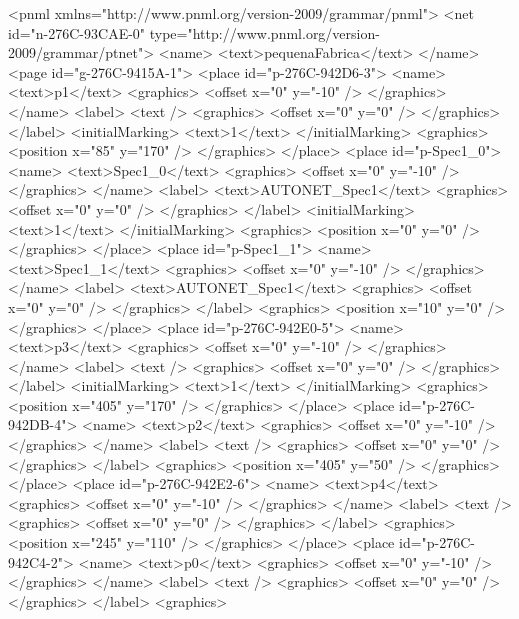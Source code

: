 <pnml xmlns="http://www.pnml.org/version-2009/grammar/pnml">
 <net id="n-276C-93CAE-0" type="http://www.pnml.org/version-2009/grammar/ptnet">
  <name>
   <text>pequenaFabrica</text>
  </name>
  <page id="g-276C-9415A-1">
   <place id="p-276C-942D6-3">
    <name>
     <text>p1</text>
     <graphics>
      <offset x="0" y="-10" />
     </graphics>
    </name>
    <label>
     <text />
     <graphics>
      <offset x="0" y="0" />
     </graphics>
    </label>
    <initialMarking>
     <text>1</text>
    </initialMarking>
    <graphics>
     <position x="85" y="170" />
    </graphics>
   </place>
   <place id="p-Spec1\_0">
    <name>
     <text>Spec1\_0</text>
     <graphics>
      <offset x="0" y="-10" />
     </graphics>
    </name>
    <label>
     <text>AUTONET\_Spec1</text>
     <graphics>
      <offset x="0" y="0" />
     </graphics>
    </label>
    <initialMarking>
     <text>1</text>
    </initialMarking>
    <graphics>
     <position x="0" y="0" />
    </graphics>
   </place>
   <place id="p-Spec1\_1">
    <name>
     <text>Spec1\_1</text>
     <graphics>
      <offset x="0" y="-10" />
     </graphics>
    </name>
    <label>
     <text>AUTONET\_Spec1</text>
     <graphics>
      <offset x="0" y="0" />
     </graphics>
    </label>
    <graphics>
     <position x="10" y="0" />
    </graphics>
   </place>
   <place id="p-276C-942E0-5">
    <name>
     <text>p3</text>
     <graphics>
      <offset x="0" y="-10" />
     </graphics>
    </name>
    <label>
     <text />
     <graphics>
      <offset x="0" y="0" />
     </graphics>
    </label>
    <initialMarking>
     <text>1</text>
    </initialMarking>
    <graphics>
     <position x="405" y="170" />
    </graphics>
   </place>
   <place id="p-276C-942DB-4">
    <name>
     <text>p2</text>
     <graphics>
      <offset x="0" y="-10" />
     </graphics>
    </name>
    <label>
     <text />
     <graphics>
      <offset x="0" y="0" />
     </graphics>
    </label>
    <graphics>
     <position x="405" y="50" />
    </graphics>
   </place>
   <place id="p-276C-942E2-6">
    <name>
     <text>p4</text>
     <graphics>
      <offset x="0" y="-10" />
     </graphics>
    </name>
    <label>
     <text />
     <graphics>
      <offset x="0" y="0" />
     </graphics>
    </label>
    <graphics>
     <position x="245" y="110" />
    </graphics>
   </place>
   <place id="p-276C-942C4-2">
    <name>
     <text>p0</text>
     <graphics>
      <offset x="0" y="-10" />
     </graphics>
    </name>
    <label>
     <text />
     <graphics>
      <offset x="0" y="0" />
     </graphics>
    </label>
    <graphics>
